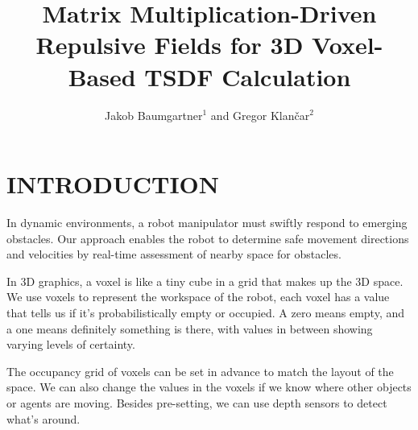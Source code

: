 \documentclass[letterpaper, 10 pt, conference]{ieeeconf}  %
\title{\LARGE \bf
Matrix Multiplication-Driven Repulsive Fields for 3D Voxel-Based TSDF Calculation
}
\author{
	Jakob Baumgartner$^{1}$ and Gregor Klančar$^{2}$%
}
\begin{document}
\maketitle
\thispagestyle{empty}
\pagestyle{empty}


\begin{abstract}



\end{abstract}


\section{INTRODUCTION}

%

In dynamic environments, a robot manipulator must swiftly respond to emerging obstacles. Our approach enables the robot to determine safe movement directions and velocities by real-time assessment of nearby space for obstacles.

In 3D graphics, a voxel is like a tiny cube in a grid that makes up the 3D space. We use voxels to represent the workspace of the robot, each voxel has a value that tells us if it’s probabilistically empty or occupied. A zero means empty, and a one means definitely something is there, with values in between showing varying levels of certainty.


The occupancy grid of voxels can be set in advance to match the layout of the space. We can also change the values in the voxels if we know where other objects or agents are moving. Besides pre-setting, we can use depth sensors to detect what's around.
\end{document}
